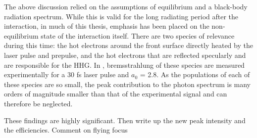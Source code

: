 The above discussion relied on the assumptions of equilibrium and a black-body radiation spectrum.
While this is valid for the long radiating period after the interaction, in much of this thesis, emphasis has been placed on the non-equilibrium state of the interaction itself. There are two species of relevance during this time: the hot electrons around the front surface directly heated by the laser pulse and prepulse, and the hot electrons that are reflected specularly and are responsible for the HHG. In \cite{zulickHighResolutionBremsstrahlung2013}, bremsstrahlung of these species are measured experimentally for a 30 fs laser pulse and $a_0$ = 2.8. As the populations of each of these species are so small, the peak contribution to the photon spectrum is many orders of magnitude smaller than that of the experimental signal and can therefore be neglected.

These findings are highly significant. 
Then write up the new peak intensity and the efficiencies.
Comment on flying focus



 